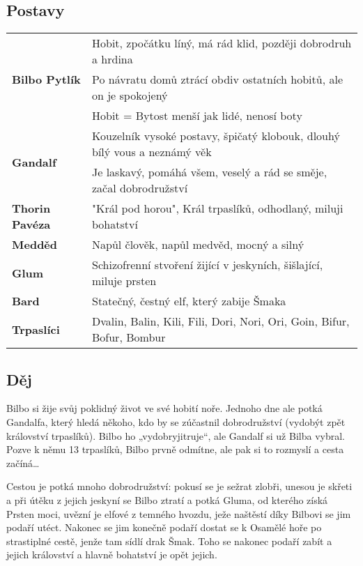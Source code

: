 \subsection*{Postavy}
\begin{tabularx}{\linewidth}{l|l}
    \multirow{3}{15em}{\textbf{Bilbo Pytlík}} & Hobit, zpočátku líný, má rád klid, později dobrodruh a hrdina             \\
                                              & Po návratu domů ztrácí obdiv ostatních hobitů, ale on je spokojený        \\
                                              & Hobit = Bytost menší jak lidé, nenosí boty                                \\
    \hline
    \multirow{2}{15em}{\textbf{Gandalf}}      & Kouzelník vysoké postavy, špičatý klobouk, dlouhý bílý vous a neznámý věk \\
                                              & Je laskavý, pomáhá všem, veselý a rád se směje, začal dobrodružství       \\
    \hline
    \textbf{Thorin Pavéza}                    & "Král pod horou", Král trpaslíků, odhodlaný, miluji bohatství             \\
    \hline
    \textbf{Medděd}                           & Napůl člověk, napůl medvěd, mocný a silný                                 \\
    \hline
    \textbf{Glum}                             & Schizofrenní stvoření žijící v jeskyních, šišlající, miluje prsten        \\
    \hline
    \textbf{Bard}                             & Statečný, čestný elf, který zabije Šmaka                                  \\
    \hline
    \textbf{Trpaslíci}                        & Dvalin, Balin, Kili, Fili, Dori, Nori, Ori, Goin, Bifur, Bofur, Bombur    \\
\end{tabularx}
\subsection*{Děj}
Bilbo si žije svůj poklidný život ve své hobití noře.
Jednoho dne ale potká Gandalfa, který hledá někoho, kdo by se zúčastnil dobrodružství (vydobýt zpět království trpaslíků).
Bilbo ho „vydobryjitruje“, ale Gandalf si už Bilba vybral.
Pozve k němu 13 trpaslíků, Bilbo prvně odmítne, ale pak si to rozmyslí a cesta začíná…

Cestou je potká mnoho dobrodružství: pokusí se je sežrat zlobři, unesou je skřeti a při útěku z jejich jeskyní se Bilbo ztratí a potká Gluma, od kterého získá Prsten moci, uvězní je elfové z temného hvozdu, ježe naštěstí díky Bilbovi se jim podaří utéct.
Nakonec se jim konečně podaří dostat se k Osamělé hoře po strastiplné cestě, jenže tam sídlí drak Šmak.
Toho se nakonec podaří zabít a jejich království a hlavně bohatství je opět jejich.

